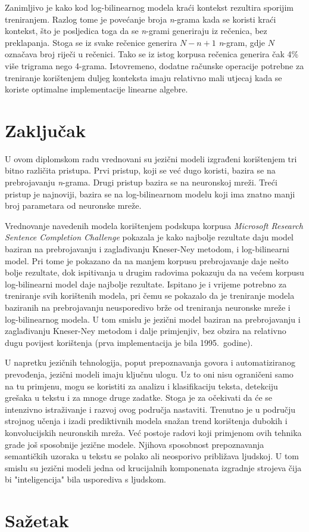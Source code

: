 \documentclass[times, utf8, diplomski, numeric]{fer}
\begin{document}
Zanimljivo je kako kod log-bilinearnog modela kraći kontekst rezultira sporijim treniranjem. Razlog tome je povećanje broja \textit{n}-grama kada se koristi kraći kontekst, što je posljedica toga da se \textit{n}-grami generiraju iz rečenica, bez preklapanja. Stoga se iz svake rečenice generira $N - n + 1$ \textit{n}-gram, gdje $N$ označava broj riječi u rečenici. Tako se iz istog korpusa rečenica generira čak 4\% više trigrama nego 4-grama. Istovremeno, dodatne računske operacije potrebne za treniranje korištenjem duljeg konteksta imaju relativno mali utjecaj kada se koriste optimalne implementacije linearne algebre.

\chapter{Zaključak}

U ovom diplomskom radu vrednovani su jezični modeli izgrađeni korištenjem tri bitno različita pristupa. Prvi pristup, koji se već dugo koristi, bazira se na prebrojavanju \textit{n}-grama. Drugi pristup bazira se na neuronskoj mreži. Treći pristup je najnoviji, bazira se na log-bilinearnom modelu koji ima znatno manji broj parametara od neuronske mreže.

Vrednovanje navedenih modela korištenjem podskupa korpusa \textit{Microsoft Research Sentence Completion Challenge} pokazala je kako najbolje rezultate daju model baziran na prebrojavanju i zaglađivanju Kneser-Ney metodom, i log-bilinearni model. Pri tome je pokazano da na manjem korpusu prebrojavanje daje nešto bolje rezultate, dok ispitivanja u drugim radovima pokazuju da na većem korpusu log-bilinearni model daje najbolje rezultate. Ispitano je i vrijeme potrebno za treniranje svih korištenih modela, pri čemu se pokazalo da je treniranje modela baziranih na prebrojavanju neusporedivo brže od treniranja neuronske mreže i log-bilinearnog modela. U tom smislu je jezični model baziran na prebrojavanju i zaglađivanju Kneser-Ney metodom i dalje primjenjiv, bez obzira na relativno dugu povijest korištenja (prva implementacija je bila 1995.\ godine).

U napretku jezičnih tehnologija, poput prepoznavanja govora i automatiziranog prevođenja, jezični modeli imaju ključnu ulogu. Uz to oni nisu ograničeni samo na tu primjenu, mogu se koristiti za analizu i klasifikaciju teksta, detekciju grešaka u tekstu i za mnoge druge zadatke. Stoga je za očekivati da će se intenzivno istraživanje i razvoj ovog područja nastaviti. Trenutno je u području strojnog učenja i izadi prediktivnih modela snažan trend korištenja dubokih i konvolucijskih neuronskih mreža. Već postoje radovi koji primjenom ovih tehnika grade još sposobnije jezične modele. Njihova sposobnost prepoznavanja semantičkih uzoraka u tekstu se polako ali neosporivo približava ljudskoj. U tom smislu su jezični modeli jedna od krucijalnih komponenata izgradnje strojeva čija bi "inteligencija" bila usporediva s ljudskom.




\chapter{Sažetak}
\end{document}
